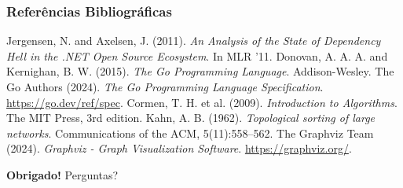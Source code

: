 \documentclass{beamer}
\begin{document}
\begin{frame}
  \frametitle{Referências Bibliográficas}
  \small{
      \begin{thebibliography}{99}
         Jergensen, N. and Axelsen, J. (2011). \textit{An Analysis of the State of Dependency Hell in the .NET Open Source Ecosystem}. In MLR '11.
         Donovan, A. A. A. and Kernighan, B. W. (2015). \textit{The Go Programming Language}. Addison-Wesley.
         The Go Authors (2024). \textit{The Go Programming Language Specification}. \url{https://go.dev/ref/spec}.
         Cormen, T. H. et al. (2009). \textit{Introduction to Algorithms}. The MIT Press, 3rd edition.
         Kahn, A. B. (1962). \textit{Topological sorting of large networks}. Communications of the ACM, 5(11):558–562.
         The Graphviz Team (2024). \textit{Graphviz - Graph Visualization Software}. \url{https://graphviz.org/}.
      \end{thebibliography}
  }
\end{frame}

\begin{frame}
  \vfill
  \centering
  \huge{\textbf{Obrigado!}}
  \vspace{1cm}
  \Large{Perguntas?}
  \vfill
\end{frame}
\end{document}
